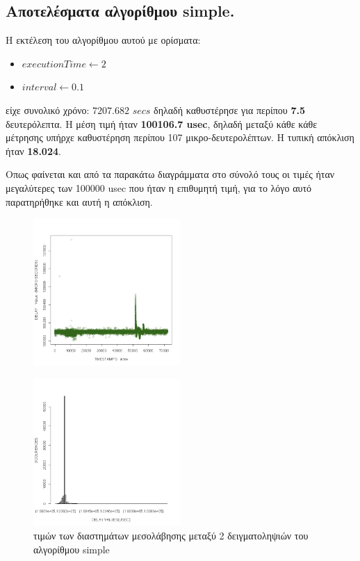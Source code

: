 \documentclass[12pt, a4paper]{article}
\begin{document}
\subsection{Αποτελέσματα αλγορίθμου \textlatin{simple}.}
\justify
Η εκτέλεση του αλγορίθμου αυτού με ορίσματα:
\begin{itemize}
    \item $executionTime \longleftarrow 2$
    \item $interval \longleftarrow 0.1$
\end{itemize}
είχε συνολικό χρόνο: $7207.682$ $secs$ δηλαδή καθυστέρησε για περίπου \textbf{7.5} δευτερόλεπτα. Η μέση τιμή ήταν \textbf{100106.7 \textlatin{usec}}, δηλαδή μεταξύ κάθε κάθε μέτρησης υπήρχε καθυστέρηση περίπου 107 μικρο-δευτερολέπτων. Η τυπική απόκλιση ήταν \textbf{18.024}.

\justify
Οπως φαίνεται και από τα παρακάτω διαγράμματα στο σύνολό τους οι τιμές ήταν μεγαλύτερες των 100000 \textlatin{usec} που ήταν η επιθυμητή τιμή, για το λόγο αυτό παρατηρήθηκε και αυτή η απόκλιση. 
\begin{figure}[H]
        
        \caption{}
        \centering
        \includegraphics[width=0.5\textwidth]{images/simple.png}
\end{figure}
\begin{figure}[H]
    \caption{ τιμών των διαστημάτων μεσολάβησης μεταξύ 2 δειγματοληψιών του αλγορίθμου \textlatin{simple}}
    \centering
    \includegraphics[width=0.5\textwidth]{images/simple_distribution.png}

\end{figure}
\pagebreak
\end{document}
